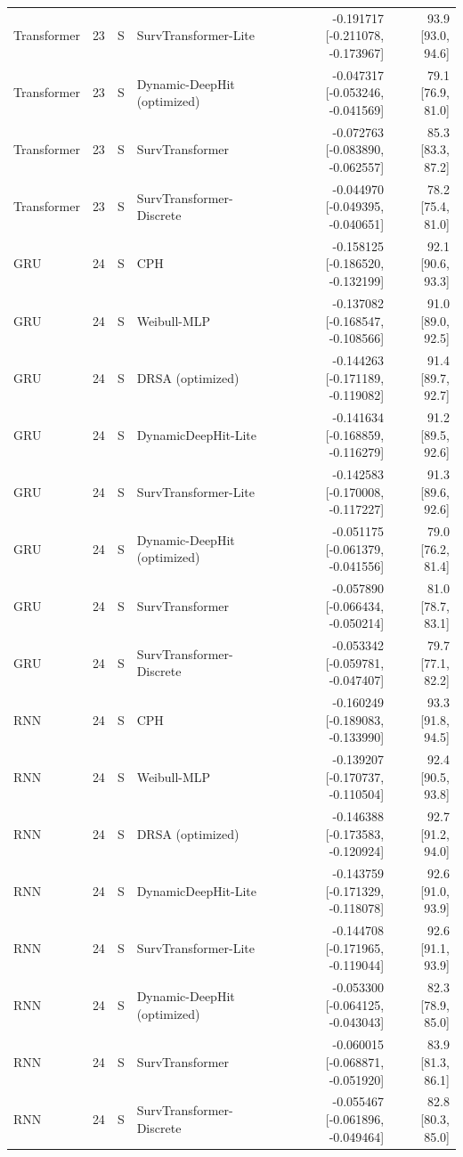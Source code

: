 \begin{longtable}{lll p{3.0cm} rr}
Transformer & 23 & S & SurvTransformer-Lite & -0.191717 [-0.211078, -0.173967] & 93.9 [93.0, 94.6]\\
Transformer & 23 & S & Dynamic-DeepHit (optimized) & -0.047317 [-0.053246, -0.041569] & 79.1 [76.9, 81.0]\\
Transformer & 23 & S & SurvTransformer & -0.072763 [-0.083890, -0.062557] & 85.3 [83.3, 87.2]\\
Transformer & 23 & S & SurvTransformer-Discrete & -0.044970 [-0.049395, -0.040651] & 78.2 [75.4, 81.0]\\
GRU & 24 & S & CPH & -0.158125 [-0.186520, -0.132199] & 92.1 [90.6, 93.3]\\
GRU & 24 & S & Weibull-MLP & -0.137082 [-0.168547, -0.108566] & 91.0 [89.0, 92.5]\\
GRU & 24 & S & DRSA (optimized) & -0.144263 [-0.171189, -0.119082] & 91.4 [89.7, 92.7]\\
GRU & 24 & S & DynamicDeepHit-Lite & -0.141634 [-0.168859, -0.116279] & 91.2 [89.5, 92.6]\\
GRU & 24 & S & SurvTransformer-Lite & -0.142583 [-0.170008, -0.117227] & 91.3 [89.6, 92.6]\\
GRU & 24 & S & Dynamic-DeepHit (optimized) & -0.051175 [-0.061379, -0.041556] & 79.0 [76.2, 81.4]\\
GRU & 24 & S & SurvTransformer & -0.057890 [-0.066434, -0.050214] & 81.0 [78.7, 83.1]\\
GRU & 24 & S & SurvTransformer-Discrete & -0.053342 [-0.059781, -0.047407] & 79.7 [77.1, 82.2]\\
RNN & 24 & S & CPH & -0.160249 [-0.189083, -0.133990] & 93.3 [91.8, 94.5]\\
RNN & 24 & S & Weibull-MLP & -0.139207 [-0.170737, -0.110504] & 92.4 [90.5, 93.8]\\
RNN & 24 & S & DRSA (optimized) & -0.146388 [-0.173583, -0.120924] & 92.7 [91.2, 94.0]\\
RNN & 24 & S & DynamicDeepHit-Lite & -0.143759 [-0.171329, -0.118078] & 92.6 [91.0, 93.9]\\
RNN & 24 & S & SurvTransformer-Lite & -0.144708 [-0.171965, -0.119044] & 92.6 [91.1, 93.9]\\
RNN & 24 & S & Dynamic-DeepHit (optimized) & -0.053300 [-0.064125, -0.043043] & 82.3 [78.9, 85.0]\\
RNN & 24 & S & SurvTransformer & -0.060015 [-0.068871, -0.051920] & 83.9 [81.3, 86.1]\\
RNN & 24 & S & SurvTransformer-Discrete & -0.055467 [-0.061896, -0.049464] & 82.8 [80.3, 85.0]\\

\end{longtable}
